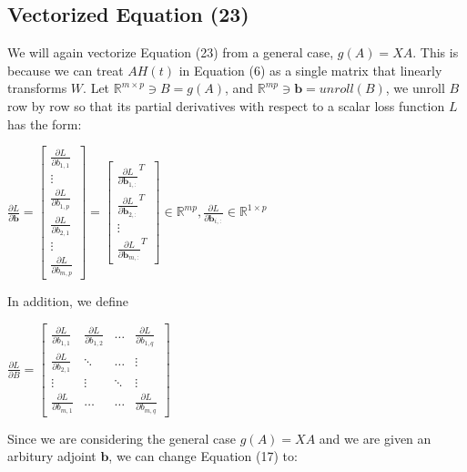 \documentclass{article}
\begin{document}
\subsection{Vectorized Equation (23)}
We will again vectorize Equation (23) from a general case, $g(A)=XA$. This is because we can treat $AH(t)$ in Equation (6) as a single matrix that linearly transforms $W$. Let $ \mathbb{R}^{m\times p}\ni B = g(A)$, and $\mathbb{R}^{mp}\ni\mathbf{b} = unroll(B)$, we unroll $B$ row by row so that its partial derivatives with respect to a scalar loss function $L$ has the form:
\begin{center}
    $\frac{\partial L}{\partial \mathbf{b}} = 
    \begin{bmatrix}
        \frac{\partial L}{\partial b_{1,1}} \\ \vdots \\\frac{\partial L}{\partial b_{1,p}}\\ \frac{\partial L}{\partial b_{2,1}} \\ \vdots \\ \frac{\partial L}{\partial b_{m,p}}
    \end{bmatrix} =
    \begin{bmatrix}
        \frac{\partial L}{\partial \mathbf{b}_{1,:}}^T \\ \frac{\partial L}{\partial \mathbf{b}_{2,:}}^T\\ \vdots \\ \frac{\partial L}{\partial \mathbf{b}_{m,:}}^T
    \end{bmatrix} \in \mathbb{R}^{mp}, \frac{\partial L}{\partial \mathbf{b}_{i,:}} \in \mathbb{R}^{1\times p}
    $ 
\end{center}
In addition, we define
\begin{center}
    $\frac{\partial L}{\partial B} = \begin{bmatrix}
        \frac{\partial L}{\partial b_{1,1}} & \frac{\partial L}{\partial b_{1,2}} & \hdots &\frac{\partial L}{\partial b_{1,q} } \\
        \frac{\partial L}{\partial b_{2,1}} & \ddots & \hdots &\vdots \\
        \vdots & \vdots & \ddots & \vdots\\
        \frac{\partial L}{\partial b_{m,1}} & \hdots & \hdots &\frac{\partial L}{\partial b_{m,q}}
    \end{bmatrix}$
\end{center}
Since we are considering the general case $g(A)=XA$ and we are given an arbitury adjoint $\mathbf{b}$, we can change Equation (17) to:
\end{document}
